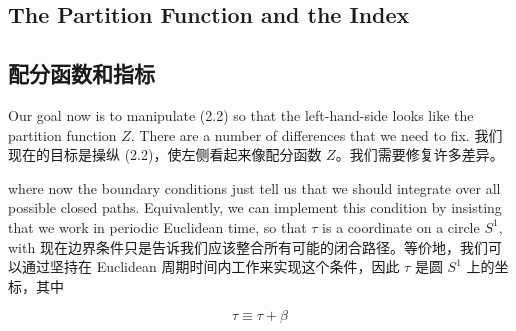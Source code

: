 \documentclass{article}
\begin{document}
\begin{paracol}{2}
\subsection{The Partition Function and the Index}
\switchcolumn
\subsection*{配分函数和指标}
\switchcolumn*

Our goal now is to manipulate (2.2) so that the left-hand-side looks like the partition function $Z$. There are a number of differences that we need to fix.
\switchcolumn
我们现在的目标是操纵 (2.2)，使左侧看起来像配分函数 $Z$。我们需要修复许多差异。
\switchcolumn*

where now the boundary conditions just tell us that we should integrate over all possible closed paths. Equivalently, we can implement this condition by insisting that we work in periodic Euclidean time, so that $\tau$ is a coordinate on a circle $S^1$, with
\switchcolumn
现在边界条件只是告诉我们应该整合所有可能的闭合路径。等价地，我们可以通过坚持在 Euclidean 周期时间内工作来实现这个条件，因此 $\tau$ 是圆 $S^1$ 上的坐标，其中
\end{paracol}

\[ \tau \equiv \tau + \beta \]
\end{document}
